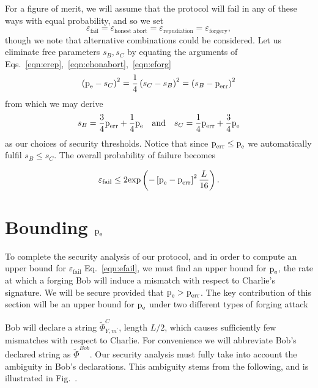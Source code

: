 For a figure of merit, we will assume that the protocol will fail in any of these ways with equal probability, and so we set
\begin{equation}
\varepsilon_{\text{fail}} = \varepsilon_{\text{honest abort}} = \varepsilon_{\text{repudiation}} = \varepsilon_{\text{forgery}},
\end{equation}
though we note that alternative combinations could be considered. Let us eliminate free parameters $s_B, s_C$ by equating the arguments of Eqs.~\ref{eqn:erep},~\ref{eqn:ehonabort},~\ref{eqn:eforg}
\begin{equation}
\left(\text{p}_{\text{e}} - s_C\right)^2  = \frac{1}{4}\left(s_C - s_B\right)^2 = \left(s_B - \text{p}_{\text{err}}\right)^2
\end{equation}
from which we may derive
\begin{equation}
s_B = \frac{3}{4} \perr + \frac{1}{4}\pe \qq{and} s_C = \frac{1}{4}\perr + \frac{3}{4}\pe
\end{equation}
as our choices of security thresholds. Notice that since $\text{p}_{\text{err}} \le \text{p}_{\text{e}}$ we automatically fulfil $s_B \le s_C$. The overall probability of failure becomes

\begin{equation}\label{eqn:efail}
\varepsilon_{\text{fail}} \le 2 \text{exp}\left( - \left[\text{p}_{\text{e}} - \text{p}_{\text{err}}\right]^2 \frac{L}{16}\right).
\end{equation}

\section{Bounding $\text{p}_{\text{e}}$}
To complete the security analysis of our protocol, and in order to compute an upper bound for $\varepsilon_{\text{fail}}$ Eq.~\ref{eqn:efail}, we must find an upper bound for $\text{p}_{\text{e}}$, the rate at which a forging Bob will induce a mismatch with respect to Charlie's signature. We will be secure provided that $\text{p}_{\text{e}} > \text{p}_{\text{err}}$. The key contribution of this section will be an upper bound for $\text{p}_{\text{e}}$ under two different types of forging attack



Bob will declare a string $\tilde{\Phi}_{Y, m^\prime}^C$, length $L/2$,  which causes sufficiently few mismatches with respect to Charlie. For convenience we will abbreviate Bob's declared string as $\tilde{\Phi}^{Bob}$. Our security analysis must fully take into account the ambiguity in Bob's declarations. This ambiguity stems from the following, and is illustrated in Fig.~.

